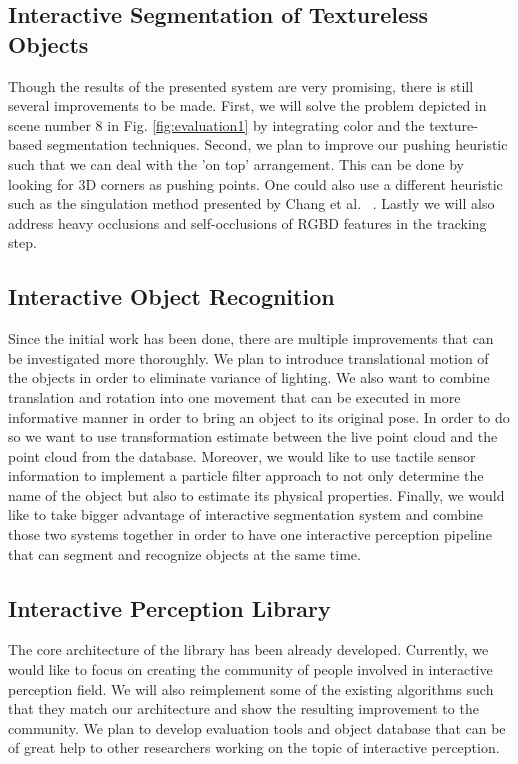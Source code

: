 \subsection{Interactive Segmentation of Textureless Objects}
Though the results of the presented system are very promising, there is still several improvements to be made. First, we
will solve the problem depicted in scene number 8 in Fig. \ref{fig:evaluation1} by integrating color and the texture-based segmentation techniques.
Second, we plan to improve our pushing heuristic such that we
can deal with the ’on top’ arrangement. This can be done by
looking for 3D corners as pushing points. One could also use a
different heuristic such as the singulation method presented by
Chang et al. ~\cite{chang11interactive}. Lastly we will also address heavy occlusions
and self-occlusions of RGBD features in the tracking step.


\subsection{Interactive Object Recognition}
Since the initial work has been done, there are multiple improvements that can be investigated more thoroughly. We plan to introduce translational motion of the objects in order to eliminate variance of lighting. We also want to combine translation and rotation into one movement that can be executed in more informative manner in order to bring an object to its original pose. In order to do so we want to use transformation estimate between the live point cloud and the point cloud from the database. Moreover, we would like to use tactile sensor information to implement a particle filter approach to not only determine the name of the object but also to estimate its physical properties. Finally, we would like to take bigger advantage of interactive segmentation system and combine those two systems together in order to have one interactive perception pipeline that can segment and recognize objects at the same time. 


\subsection{Interactive Perception Library}
The core architecture of the library has been already developed. Currently, we would like to focus on creating the community of people involved in interactive perception field. We will also reimplement some of the existing algorithms such that they match our architecture and show the resulting improvement to the community. We plan to develop evaluation tools and object database that can be of great help to other researchers working on the topic of interactive perception.